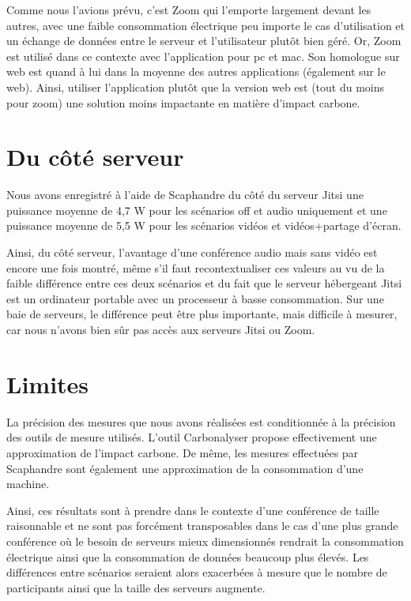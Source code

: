 \documentclass[11pt,a4paper]{report}
\begin{document}
Comme nous l'avions prévu, c'est Zoom qui l'emporte largement devant les autres, avec une faible consommation électrique peu importe le cas d'utilisation et un échange de données entre le serveur et l'utilisateur plutôt bien géré. Or, Zoom est utilisé dans ce contexte avec l'application pour pc et mac. Son homologue sur web est quand à lui dans la moyenne des autres applications (également sur le web). Ainsi, utiliser l'application plutôt que la version web est (tout du moins pour zoom) une solution moins impactante en matière d'impact carbone.

\section{Du côté serveur}
Nous avons enregistré à l'aide de Scaphandre du côté du serveur Jitsi une puissance moyenne de 4,7 W pour les scénarios off et audio uniquement et une puissance moyenne de 5,5 W pour les scénarios vidéos et vidéos+partage d'écran. 

Ainsi, du côté serveur, l'avantage d'une conférence audio mais sans vidéo est encore une fois montré, même s'il faut recontextualiser ces valeurs au vu de la faible différence entre ces deux scénarios et du fait que le serveur hébergeant Jitsi est un ordinateur portable avec un processeur à basse consommation. Sur une baie de serveurs, le différence peut être plus importante, mais difficile à mesurer, car nous n'avons bien sûr pas accès aux serveurs Jitsi ou Zoom.

\section{Limites}

La précision des mesures que nous avons réalisées est conditionnée à la précision des outils de mesure utilisés. L'outil Carbonalyser propose effectivement une approximation de l'impact carbone. De même, les mesures effectuées par Scaphandre sont également une approximation de la consommation d'une machine. 

Ainsi, ces résultats sont à prendre dans le contexte d'une conférence de taille raisonnable et ne sont pas forcément transposables dans le cas d'une plus grande conférence où le besoin de serveurs mieux dimensionnés rendrait la consommation électrique ainsi que la consommation de données beaucoup plus élevés. Les différences entre scénarios seraient alors exacerbées à mesure que le nombre de participants ainsi que la taille des serveurs augmente.
\end{document}
